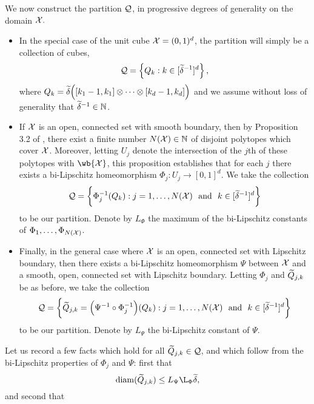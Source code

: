 We now construct the partition $\mathcal{Q}$, in progressive degrees of generality on the domain $\mathcal{X}.$
\begin{itemize}
	\item In the special case of the unit cube $\mathcal{X} = (0,1)^d$, the partition will simply be a collection of cubes,
	\begin{equation*}
	\mathcal{Q} = \left\{Q_k: k \in [\widetilde{\delta}^{-1}]^d\right\},
	\end{equation*}
	where $Q_k = \widetilde{\delta}\Bigl([k_1 - 1,k_1] \otimes \cdots \otimes [k_d - 1,k_d]\Bigr)$ and we assume without loss of generality that $\widetilde{\delta}^{-1} \in \mathbb{N}$.
	\item If $\mathcal{\mathcal{X}}$ is an open, connected set with smooth boundary, then by Proposition 3.2 of \citet{trillos2015}, there exist a finite number $N(\mathcal{X}) \in \mathbb{N}$ of disjoint polytopes which cover $\mathcal{X}$. Moreover, letting $U_j$ denote the intersection of the $j$th of these polytopes with $\wb{\Xset}$, this proposition establishes that for each $j$ there exists a bi-Lipschitz homeomorphism $\Phi_j: U_j \to [0,1]^d$. We take the collection
	\begin{equation*}
	\mathcal{Q} = \biggl\{\Phi_j^{-1}(Q_k): j = 1,\ldots,N(\mathcal{X})~~\textrm{and}~~k \in [\widetilde{\delta}^{-1}]^d\biggr\}
	\end{equation*}
	to be our partition. Denote by $L_{\Phi}$ the maximum of the bi-Lipschitz constants of $\Phi_1,\ldots,\Phi_{N(\mathcal{X})}$.
	\item Finally, in the general case where $\mathcal{X}$ is an open, connected set with Lipschitz boundary, then there exists a bi-Lipschitz homeomorphism $\Psi$ between $\mathcal{X}$ and a smooth, open, connected set with Lipschitz boundary. Letting $\Phi_j$ and $\widetilde{Q}_{j,k}$ be as before, we take the collection
	\begin{equation*}
	\mathcal{Q} = \biggl\{\widetilde{Q}_{j,k} = \Bigl(\Psi^{-1} \circ \Phi_j^{-1}\Bigr)(Q_k): j = 1,\ldots,N(\mathcal{X})~~\textrm{and}~~k \in [\widetilde{\delta}^{-1}]^d\biggr\}
	\end{equation*}
	to be our partition. Denote by $L_{\Psi}$ the bi-Lipschitz constant of $\Psi$.
\end{itemize}
Let us record a few facts which hold for all $\widetilde{Q}_{j,k} \in \mathcal{Q}$, and which follow from the bi-Lipschitz properties of $\Phi_j$ and $\Psi$: first that
\begin{equation}
\label{pf:prop_optimal_transport_1}
\diam(\wt{Q}_{j,k}) \leq L_{\Psi} \L_{\Phi} \wt{\delta},
\end{equation}
and second that
